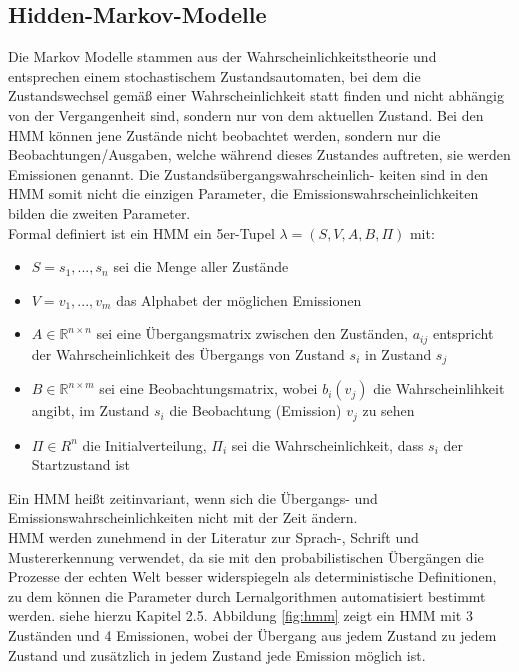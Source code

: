 \subsection{Hidden-Markov-Modelle}
\label{sec:hiddenmarkovmodel}

Die Markov Modelle stammen aus der Wahrscheinlichkeitstheorie und entsprechen einem stochastischem Zustandsautomaten, bei dem die Zustandswechsel gemäß einer Wahrscheinlichkeit statt finden und nicht abhängig von der Vergangenheit sind, sondern nur von dem aktuellen Zustand.
Bei den HMM\cite{Stamp04arevealing} können jene Zustände nicht beobachtet werden, sondern nur die Beobachtungen/Ausgaben, welche während dieses Zustandes auftreten, sie werden Emissionen genannt.
Die Zustandsübergangswahrscheinlich- keiten sind in den HMM somit nicht die einzigen Parameter, die Emissionswahrscheinlichkeiten bilden die zweiten Parameter.\\
Formal definiert ist ein HMM ein 5er-Tupel $\lambda= (S, V, A, B, \Pi)$ mit:
\begin{itemize}
 \item $S = {s_1,..., s_n}$ sei die Menge aller Zustände
 \item $V = {v_1,..., v_m}$ das Alphabet der möglichen Emissionen
 \item $A \in \mathbb{R}^{n \times n}$ sei eine Übergangsmatrix zwischen den Zuständen, $a_{ij}$ entspricht der Wahrscheinlichkeit des Übergangs von Zustand $s_i$ in Zustand $s_j$
 \item $B \in \mathbb{R}^{n\times m}$ sei eine Beobachtungsmatrix, wobei $b_i(v_j)$ die Wahrscheinlihkeit angibt, im Zustand $s_i$ die Beobachtung (Emission) $v_j$ zu sehen
 \item $\Pi \in R^n$ die Initialverteilung, $\Pi_i$ sei die Wahrscheinlichkeit, dass $s_i$ der Startzustand ist
\end{itemize}
Ein HMM heißt zeitinvariant, wenn sich die Übergangs- und Emissionswahrscheinlichkeiten nicht mit der Zeit ändern.\\
HMM werden zunehmend in der Literatur zur Sprach-, Schrift und Mustererkennung \cite{Gales:2007:AHM:1373536.1373537}\cite{Yang1995161} verwendet, da sie mit den probabilistischen Übergängen die Prozesse der echten Welt besser widerspiegeln als deterministische Definitionen, zu dem können die Parameter durch Lernalgorithmen automatisiert bestimmt werden.
 siehe hierzu Kapitel 2.5.
Abbildung \ref{fig:hmm} zeigt ein HMM mit 3 Zuständen und 4 Emissionen, wobei der Übergang aus jedem Zustand zu jedem Zustand und zusätzlich in jedem Zustand jede Emission möglich ist.
